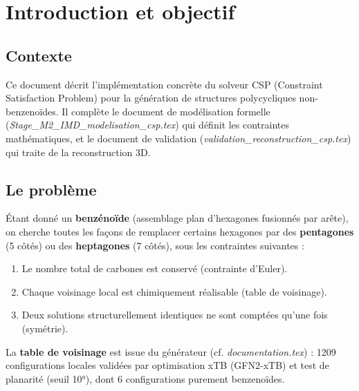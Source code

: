 \section{Introduction et objectif}

\subsection{Contexte}

Ce document décrit l'implémentation concrète du solveur CSP (Constraint Satisfaction Problem)
pour la génération de structures polycycliques non-benzenoïdes. Il complète le document de
modélisation formelle (\textit{Stage\_M2\_IMD\_modelisation\_csp.tex}) qui définit les contraintes
mathématiques, et le document de validation (\textit{validation\_reconstruction\_csp.tex}) qui
traite de la reconstruction 3D.

\subsection{Le problème}

Étant donné un \textbf{benzénoïde} (assemblage plan d'hexagones fusionnés par arête), on cherche
toutes les façons de remplacer certains hexagones par des \textbf{pentagones} (5 côtés) ou des
\textbf{heptagones} (7 côtés), sous les contraintes suivantes :
\begin{enumerate}
  \item Le nombre total de carbones est conservé (contrainte d'Euler).
  \item Chaque voisinage local est chimiquement réalisable (table de voisinage).
  \item Deux solutions structurellement identiques ne sont comptées qu'une fois (symétrie).
\end{enumerate}

La \textbf{table de voisinage} est issue du générateur (cf. \textit{documentation.tex}) :
1209 configurations locales validées par optimisation xTB (GFN2-xTB) et test de planarité
(seuil 10°), dont 6 configurations purement benzenoïdes.
